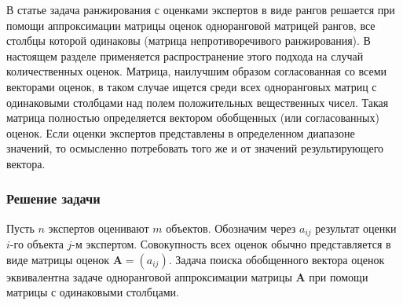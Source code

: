 \documentclass[specialist,
               substylefile = spbu.rtx,
               subf,href,colorlinks=true, 12pt]{disser}
\theoremstyle{definition}
\begin{document}

В статье \cite{Artamonov2016Group} задача ранжирования с оценками экспертов в виде рангов решается при помощи аппроксимации матрицы оценок одноранговой матрицей рангов, все столбцы которой одинаковы (матрица непротиворечивого ранжирования). 
В настоящем разделе применяется распространение этого подхода на случай количественных оценок. Матрица, наилучшим образом согласованная со всеми векторами оценок, в таком случае ищется среди всех одноранговых матриц с одинаковыми столбцами над полем положительных вещественных чисел. Такая матрица полностью определяется вектором обобщенных (или согласованных) оценок. %
Если оценки экспертов представлены в определенном диапазоне значений, 
то осмысленно потребовать того же и от значений результирующего вектора.


%

\subsubsection{Решение задачи}
Пусть $n$ экспертов оценивают $m$ объектов. Обозначим через $a_{ij}$ результат оценки $i$-го объекта $j$-м экспертом. Совокупность всех оценок обычно представляется в виде матрицы оценок $\bm{A}=(a_{ij})$.
Задача поиска обобщенного вектора оценок эквивалентна задаче %
одноранговой аппроксимации матрицы $\bm{A}$ при помощи матрицы с одинаковыми столбцами.
\end{document}
